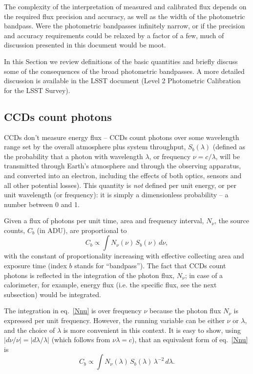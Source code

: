 \documentclass[DM,lsstdraft,toc,usenatbib]{lsstdoc}
\begin{document}
The complexity of the interpretation of measured and calibrated flux depends on
the required flux precision and accuracy, as well as the width of the photometric bandpass.
Were the photometric bandpasses infinitely narrow, or if the precision and accuracy
requirements could be relaxed by a factor of a few, much of discussion presented in this
document would be moot.

In this Section we review definitions of the basic quantities and briefly discuss some of the
consequences of the broad photometric bandpasses. A more detailed discussion is
available in the LSST document  (Level 2 Photometric Calibration for the LSST Survey).


\subsection{CCDs count photons}

CCDs don't measure energy flux -- CCDs count photons over some wavelength range set
by the overall atmosphere plus system throughput,  $S_b(\lambda)$ (defined as the probability
that a photon with wavelength $\lambda$, or frequency $\nu=c/\lambda$,  will be
transmitted through Earth's atmosphere and through the observing apparatus, and converted
into an electron, including the effects of both optics, sensors and all other potential losses).
This quantity is \textit{not}  defined per unit energy, or per unit wavelength (or frequency):
it is simply a dimensionless probability -- a number between 0 and 1.

Given a flux of photons per unit time, area and frequency interval, $N_\nu$, the
source counts, $C_b$ (in ADU), are proportional to
\begin{equation}
\label{Nnu}
        C_b \propto \int N_\nu(\nu) \, S_b(\nu) \, d\nu,
\end{equation}
with the constant of proportionality increasing with effective collecting area and exposure
time (index $b$ stands for ``bandpass''). The fact that CCDs count photons is reflected in
the integration of the photon flux, $N_\nu$; in case of a calorimeter, for example, energy
flux (i.e. the specific flux, see the next subsection) would be integrated.

The integration in eq.~\ref{Nnu} is over frequency $\nu$ because the photon flux $N_\nu$
is expressed per unit frequency. However, the running variable can be either  $\nu$ or
$\lambda$, and the choice of $\lambda$ is more convenient in this context. It is
easy to show, using $|d\nu/\nu| = |d\lambda / \lambda|$ (which follows from $\nu \lambda=c$),
that an equivalent form of  eq.~\ref{Nnu} is
\begin{equation}
\label{Nnu2}
         C_b\propto \int N_\nu(\lambda) \, S_b(\lambda) \, \lambda^{-2} \, d\lambda.
\end{equation}
\end{document}
